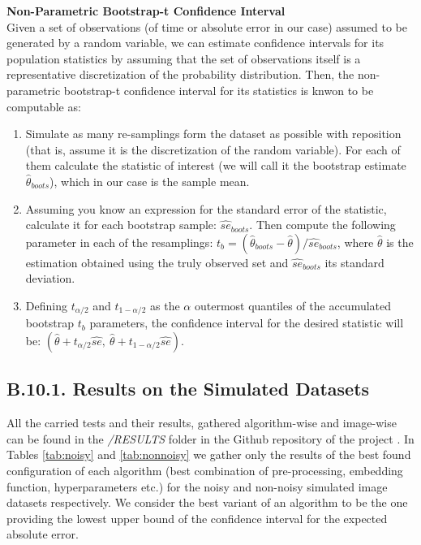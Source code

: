 \documentclass[11pt, a4paper, twoside]{article} %
\DeclareRobustCommand{\mybox}[2][gray!10]{%
\begin{tcolorbox}[   %
        left=0.2cm,
        right=0.2cm,
        top=0.15cm,
        bottom=0.15cm,
        colback=#1,
        colframe=#1,
        width=\dimexpr\textwidth\relax, 
        enlarge left by=0mm,
        boxsep=5pt,
        arc=0pt,outer arc=0pt,
        ]
        #2
\end{tcolorbox}
}
\begin{document}
\mybox{{\bf Non-Parametric Bootstrap-t Confidence Interval \vspace{0.12cm}}\\
Given a set of observations (of time or absolute error in our case) assumed to be generated by a random variable, we can estimate confidence intervals for its population statistics by assuming that the set of observations itself is a representative discretization of the probability distribution. Then, the non-parametric bootstrap-t confidence interval for its statistics is knwon  \cite{boots} to be computable as:\vspace{-0.15cm}
\begin{enumerate}
\item Simulate as many re-samplings form the dataset as possible with reposition (that is, assume it is the discretization of the random variable). For each of them calculate the statistic of interest (we will call it the bootstrap estimate $\hat{\theta}_{boots}$), which in our case is the sample mean.
\item  Assuming you know an expression for the standard error of the statistic, calculate it for each bootstrap sample: $\hat{se}_{boots}$. Then compute the following parameter in each of the resamplings: $t_b=(\hat{\theta}_{boots}-\hat{\theta})/\hat{se}_{boots}$, where $\hat{\theta}$ is the estimation obtained using the truly observed set and $\hat{se}_{boots}$ its standard deviation.
\item  Defining $t_{\alpha/2}$ and $t_{1-\alpha/2}$ as the $\alpha$ outermost quantiles of the accumulated bootstrap $t_b$
parameters, the confidence interval for the desired statistic will be: $(\hat{\theta}+t_{\alpha/2}\hat{se},\ \hat{\theta}+t_{1-\alpha/2}\hat{se})$.
\end{enumerate}
}\vspace{-0.2cm}

\subsection*{B.10.1. Results on the Simulated Datasets}\vspace{-0.2cm}
All the carried tests and their results, gathered algorithm-wise and image-wise can be found in the {\em /RESULTS} folder in the Github repository of the project \cite{github}. In Tables \ref{tab:noisy} and \ref{tab:nonnoisy} we gather only the results of the best found configuration of each algorithm (best combination of pre-processing, embedding function, hyperparameters etc.) for the noisy and non-noisy simulated image datasets respectively. We consider the best variant of an algorithm to be the one providing the lowest upper bound of the confidence interval for the expected absolute error.\vspace{0.2cm} 
\end{document}
